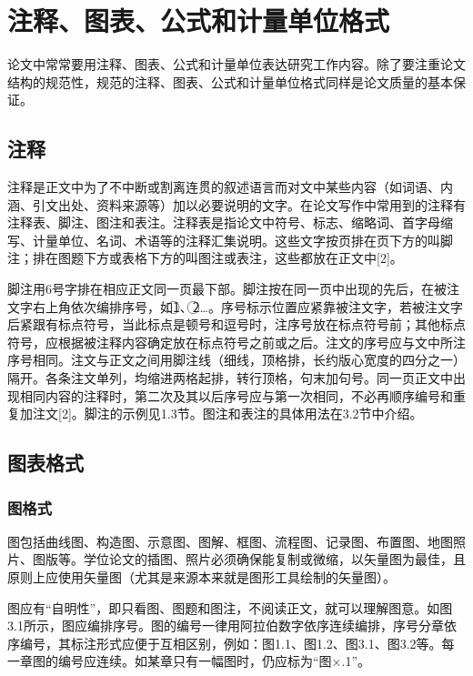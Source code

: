 
\chapter{注释、图表、公式和计量单位格式}
论文中常常要用注释、图表、公式和计量单位表达研究工作内容。除了要注重论文结构的规范性，规范的注释、图表、公式和计量单位格式同样是论文质量的基本保证。
\section{注释}
注释是正文中为了不中断或割离连贯的叙述语言而对文中某些内容（如词语、内涵、引文出处、资料来源等）加以必要说明的文字。在论文写作中常用到的注释有注释表、脚注、图注和表注。注释表是指论文中符号、标志、缩略词、首字母缩写、计量单位、名词、术语等的注释汇集说明。这些文字按页排在页下方的叫脚注；排在图题下方或表格下方的叫图注或表注，这些都放在正文中[2]。

脚注用6号字排在相应正文同一页最下部。脚注按在同一页中出现的先后，在被注文字右上角依次编排序号，如\textcircled{1}、\textcircled{2}…。序号标示位置应紧靠被注文字，若被注文字后紧跟有标点符号，当此标点是顿号和逗号时，注序号放在标点符号前；其他标点符号，应根据被注释内容确定放在标点符号之前或之后。注文的序号应与文中所注序号相同。注文与正文之间用脚注线（细线，顶格排，长约版心宽度的四分之一）隔开。各条注文单列，均缩进两格起排，转行顶格，句末加句号。同一页正文中出现相同内容的注释时，第二次及其以后序号应与第一次相同，不必再顺序编号和重复加注文[2]。脚注的示例见1.3节。图注和表注的具体用法在3.2节中介绍。



\section{图表格式}
\subsection{图格式}
图包括曲线图、构造图、示意图、图解、框图、流程图、记录图、布置图、地图照片、图版等。学位论文的插图、照片必须确保能复制或微缩，以矢量图为最佳，且原则上应使用矢量图（尤其是来源本来就是图形工具绘制的矢量图）。

图应有“自明性”，即只看图、图题和图注，不阅读正文，就可以理解图意。如图3.1所示，图应编排序号。图的编号一律用阿拉伯数字依序连续编排，序号分章依序编号，其标注形式应便于互相区别，例如：图1.1、图1.2、图3.1、图3.2等。每一章图的编号应连续。如某章只有一幅图时，仍应标为“图×.1”。

